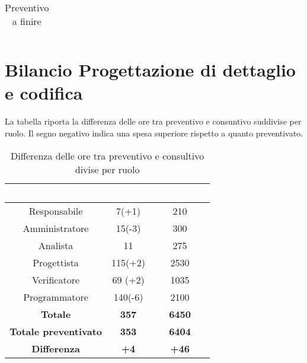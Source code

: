 \begin{flushleft}
\begin{table}[!h]
\begin{center}
\begin{tabular}{ccc}
		\end{tabular}
  
		\caption{Preventivo a finire} 
  
	\end{center}
  
\end{table}
\newpage
\section{Bilancio Progettazione di dettaglio e codifica}\label{BilProgDC}
La tabella riporta la differenza delle ore tra preventivo e consuntivo suddivise per ruolo. Il segno negativo indica una spesa superiore rispetto a quanto preventivato.\\
		\begin{table}[!h]
		\begin{center}
			\begin{tabular}{ccc}
				\rowcolor{coolblack}
				\hline
				\textcolor{white}{Ruolo} & \textcolor{white}{Ore} & \textcolor{white}{Costo in \euro}\\
				\hline
				Responsabile   & 7(+1)	&  	210 	\\ 
				Amministratore & 15(-3)	&  	300 	\\ 
				Analista       & 11 &   275\\ 
				Progettista    & 115(+2)&   2530	\\ 
				Verificatore   & 69	(+2)&  	1035	\\ 
				Programmatore  & 140(-6)&   2100	\\ \hline
				\textbf{Totale}& \textbf{357} & \textbf{6450}	\\ \hline 
				\textbf{Totale preventivato}& \textbf{353} & \textbf{6404}\\ \hline 
				\textbf{Differenza}& \textbf{+4} & \textbf{+46}	\\ \hline  
			\end{tabular}
			
			\caption{Differenza delle ore tra preventivo e consultivo divise per ruolo} 
		\end{center}
	\end{table}

	
	
	\begin{table}[!h]
		\begin{center}
			\begin{tabularx}{\textwidth}{|c|cccccc|c|}
				

\end{tabularx}
\end{center}
\end{table}
\end{flushleft}
